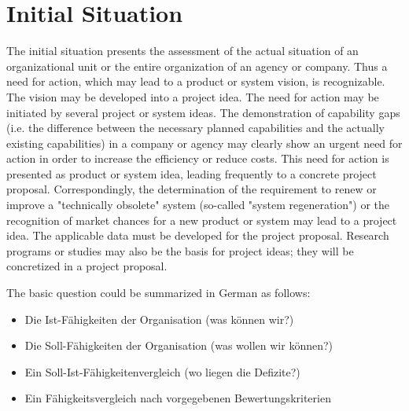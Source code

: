 \documentclass[12pt]{article}
\theoremstyle{definition}
\newenvironment{explanation}{%
   \setlength{\parindent}{0pt}
   \itshape
   \color{blue}
}{}
\begin{document}
\pagebreak

\section{Initial Situation}
\begin{explanation}
The initial situation presents the assessment of the actual situation of an organizational unit or the entire organization of an agency or company. Thus a need for action, which may lead to a product or system vision, is recognizable. The vision may be developed into a project idea. The need for action may be initiated by several project or system ideas.
The demonstration of capability gaps (i.e. the difference between the necessary planned capabilities and the actually existing capabilities) in a company or agency may clearly show an urgent need for action in order to increase the efficiency or reduce costs. This need for action is presented as product or system idea, leading frequently to a concrete project proposal. Correspondingly, the determination of the requirement to renew or improve a "technically obsolete" system (so-called "system regeneration") or the recognition of market chances for a new product or system may lead to a project idea. The applicable data must be developed for the project proposal.
Research programs or studies may also be the basis for project ideas; they will be concretized in a project proposal.

The basic question could be summarized in German as follows:
\begin{itemize}
	\item Die Ist-Fähigkeiten der Organisation (was können wir?)
	\item Die Soll-Fähigkeiten der Organisation (was wollen wir können?)
	\item Ein Soll-Ist-Fähigkeitenvergleich (wo liegen die Defizite?)
	\item Ein Fähigkeitsvergleich nach vorgegebenen Bewertungskriterien
\end{itemize}
\end{explanation}
\end{document}
